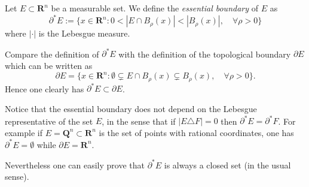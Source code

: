\documentclass[12pt]{article}
\newcommand{\R}{\mathbf R}
\begin{document}
Let $E\subset \R^n$ be a measurable set. We define the \emph{essential boundary} of $E$ as
\[
  \partial^* E := \{x\in\R^n\colon 0 < | E\cap B_\rho(x)| < |B_\rho(x)|,\quad \forall \rho>0\}
\]
where $|\cdot|$ is the Lebesgue measure.

Compare the definition of $\partial^* E$ with the definition of the topological boundary $\partial E$ which can be written as
\[
  \partial E = \{ x \in \R^n \colon \emptyset \subsetneq E\cap B_\rho(x) \subsetneq B_\rho(x),\quad \forall \rho>0\}.
\]
Hence one clearly has $\partial^* E\subset \partial E$.

Notice that the essential boundary does not depend on the Lebesgue 
representative of the set $E$, in the sense that if $|E\triangle F|=0$ then 
$\partial^* E = \partial ^* F$. For example if $E=\mathbf Q^n\subset \R^n$ is 
the set of points with rational coordinates, one has $\partial^* E=\emptyset$ 
while $\partial E=\R^n$.

Nevertheless one can easily prove that $\partial^*E$ is always a closed set (in the usual sense).

\end{document}
